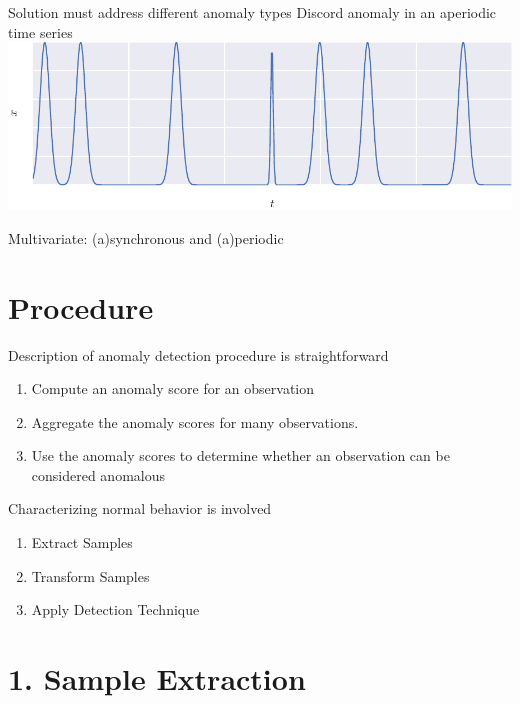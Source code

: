 \documentclass{beamer}
\begin{document}
\begin{frame}[allowframebreaks]{Solution must address different anomaly types}
    \framebreak
    Discord anomaly in an aperiodic time series
    \centering
    \includegraphics[width=\textwidth]{figs/discord_aper.pdf}

    \framebreak
    \centering
    Multivariate: (a)synchronous and (a)periodic

  \end{frame}


  \section{Procedure}

  \begin{frame}{Description of anomaly detection procedure is straightforward}

    \begin{enumerate}
    \item Compute an anomaly score for an observation
    \item Aggregate the anomaly scores for many observations.
    \item Use the anomaly scores to determine whether an observation can be considered anomalous
    \end{enumerate}

  \end{frame}

  \begin{frame}{Characterizing normal behavior is involved}

    \begin{enumerate}
    \item Extract Samples
    \item Transform Samples
    \item Apply Detection Technique
    \end{enumerate}

  \end{frame}


  \section{1. Sample Extraction}
  
\end{document}
